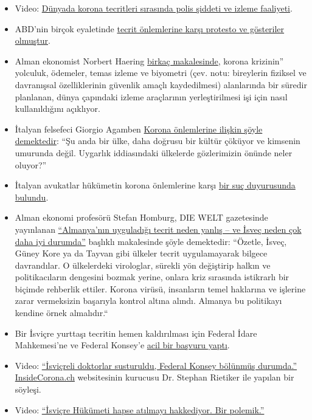 \begin{itemize}
\tightlist
\item
  Video: \href{https://www.youtube.com/watch?v=ZphK_CMUbKg}{Dünyada
  korona tecritleri sırasında polis şiddeti ve izleme faaliyeti}.
\item
  ABD'nin birçok eyaletinde
  \href{https://news.yahoo.com/protests-draw-thousands-over-state-024328374.html}{tecrit
  önlemlerine karşı protesto ve gösteriler olmuştur}.
\item
  Alman ekonomist Norbert Haering
  \href{https://norberthaering.de/}{birkaç makalesinde}, korona
  krizinin'' yolculuk, ödemeler, temas izleme ve biyometri (çev. notu:
  bireylerin fiziksel ve davranışsal özelliklerinin güvenlik amaçlı
  kaydedilmesi) alanlarında bir süredir planlanan, dünya çapındaki
  izleme araçlarının yerleştirilmesi işi için nasıl kullanıldığını
  açıklıyor.
\item
  İtalyan felsefeci Giorgio Agamben
  \href{https://www.nzz.ch/feuilleton/coronavirus-giorgio-agamben-zum-zusammenbruch-der-demokratie-ld.1551896}{Korona
  önlemlerine ilişkin şöyle demektedir}: ``Şu anda bir ülke, daha
  doğrusu bir kültür çöküyor ve kimsenin umurunda değil. Uygarlık
  iddiasındaki ülkelerde gözlerimizin önünde neler oluyor?''
\item
  İtalyan avukatlar hükümetin korona önlemlerine karşı
  \href{https://www.tvprato.it/2020/04/la-camera-civile-degli-avvocati-pratesi-chiede-lannullamento-del-dpcm-del-10-aprile-e-illegittimo/}{bir
  suç duyurusunda bulundu}.
\item
  Alman ekonomi profesörü Stefan Homburg, DIE WELT gazetesinde
  yayınlanan
  \href{https://www.msn.com/de-de/nachrichten/coronavirus/warum-deutschlands-lockdown-falsch-ist-\%E2\%80\%93-und-schweden-vieles-besser-macht/ar-BB12E6km}{``Almanya'nın
  uyguladığı tecrit neden yanlış -- ve İsveç neden çok daha iyi
  durumda''} başlıklı makalesinde şöyle demektedir: ``Özetle, İsveç,
  Güney Kore ya da Tayvan gibi ülkeler tecrit uygulamayarak bilgece
  davrandılar. O ülkelerdeki virologlar, sürekli yön değiştirip halkın
  ve politikacıların dengesini bozmak yerine, onlara kriz sırasında
  istikrarlı bir biçimde rehberlik ettiler. Korona virüsü, insanların
  temel haklarına ve işlerine zarar vermeksizin başarıyla kontrol altına
  alındı. Almanya bu politikayı kendine örnek almalıdır.``
\item
  Bir İsviçre yurttaşı tecritin hemen kaldırılması için Federal İdare
  Mahkemesi'ne ve Federal Konsey'e
  \href{https://faktenb-covid-19-massnahmen.jimdofree.com/}{acil bir
  başvuru yaptı}.
\item
  Video: \href{https://www.youtube.com/watch?v=eU6IdglI-wc}{``İsviçreli
  doktorlar susturuldu, Federal Konsey bölünmüş durumda.''}
  \href{https://www.insidecorona.ch/}{InsideCorona.ch} websitesinin
  kurucusu Dr. Stephan Rietiker ile yapılan bir söyleşi.
\item
  Video: \href{https://www.youtube.com/watch?v=SO2JMkKtq40}{``İsviçre
  Hükümeti hapse atılmayı hakkediyor. Bir polemik.''}
\end{itemize}

